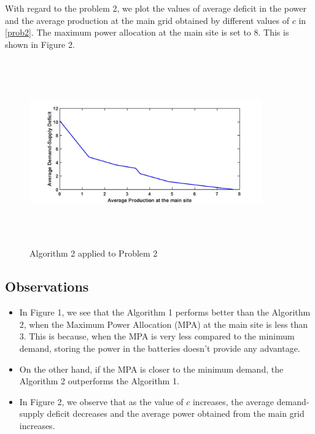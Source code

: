 \documentclass[conference]{IEEEtran}
\begin{document}
With regard to the problem 2, we plot the values of average deficit in the power and the average production at the main grid obtained by different values of $c$ in \eqref{prob2}. The maximum power allocation at the main site is set to 8. This is shown in Figure 2. 

\begin{figure}[h!]
\begin{center}
 \includegraphics[width = 10cm, height = 8cm]{plot2.jpg}
 \caption{Algorithm 2 applied to Problem 2}
 \end{center}
 \end{figure}

\subsection{Observations}

\begin{itemize}
\item In Figure 1, we see that the Algorithm 1 performs better than the Algorithm 2, when the Maximum Power Allocation (MPA) at the main site is less than 3. This is because, when the MPA is very less compared to the minimum demand, storing the power in the batteries doesn't provide any advantage. 
\item On the other hand, if the MPA is closer to the minimum demand, the Algorithm 2 outperforms the Algorithm 1. 
\item In Figure 2, we observe that as the value of $c$ increases, the average demand-supply deficit decreases and the average power obtained from the main grid increases. 
\end{itemize}
\end{document}
